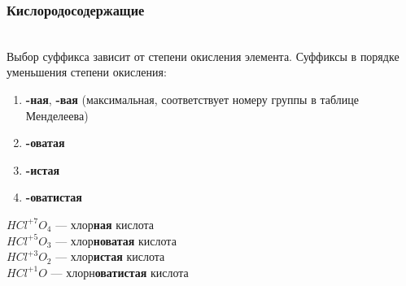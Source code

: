\subsubsection{Кислородосодержащие}
\\
Выбор суффикса зависит от степени окисления элемента.
Суффиксы в порядке уменьшения степени окисления:
\begin{enumerate}
    \item \textbf{-ная}, \textbf{-вая} (максимальная, соответствует номеру
                                        группы в таблице Менделеева)
    \item \textbf{-оватая}
    \item \textbf{-истая}
    \item \textbf{-оватистая}
\end{enumerate}
$HCl^{+7}O_4$ --- хлор\textbf{ная} кислота\\
$HCl^{+5}O_3$ --- хлор\textbf{новатая} кислота\\
$HCl^{+3}O_2$ --- хлор\textbf{истая} кислота\\
$HCl^{+1}O$   --- хлорн\textbf{оватистая} кислота\\
